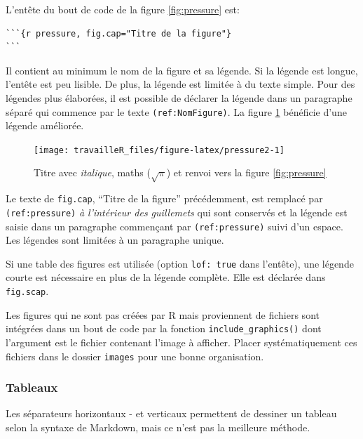 \documentclass[
  12pt,
  french,
  a4paper,
  extrafontsizes,onecolumn,openright
  ]{memoir}
\begin{document}
L'entête du bout de code de la figure \ref{fig:pressure} est:

\begin{verbatim}
```{r pressure, fig.cap="Titre de la figure"}
```
\end{verbatim}

Il contient au minimum le nom de la figure et sa légende.
Si la légende est longue, l'entête est peu lisible.
De plus, la légende est limitée à du texte simple.
Pour des légendes plus élaborées, il est possible de déclarer la légende dans un paragraphe séparé qui commence par le texte \texttt{(ref:NomFigure)}.
La figure \ref{fig:pressure2} bénéficie d'une légende améliorée.



\scriptsize

\begin{figure}

{\centering \texttt{[image: travailleR\_files/figure-latex/pressure2-1]} 

}

\caption{Titre avec \emph{italique}, maths (\(\sqrt\pi\)) et renvoi vers la figure \ref{fig:pressure}}\label{fig:pressure2}
\end{figure}

\normalsize

Le texte de \texttt{fig.cap}, \enquote{Titre de la figure} précédemment, est remplacé par \texttt{(ref:pressure)} \emph{à l'intérieur des guillemets} qui sont conservés et la légende est saisie dans un paragraphe commençant par \texttt{(ref:pressure)} suivi d'un espace.
Les légendes sont limitées à un paragraphe unique.

Si une table des figures est utilisée (option \texttt{lof:\ true} dans l'entête), une légende courte est nécessaire en plus de la légende complète.
Elle est déclarée dans \texttt{fig.scap}.

Les figures qui ne sont pas créées par R mais proviennent de fichiers sont intégrées dans un bout de code par la fonction \texttt{include\_graphics()} dont l'argument est le fichier contenant l'image à afficher.
Placer systématiquement ces fichiers dans le dossier \texttt{images} pour une bonne organisation.

\hypertarget{tableaux}{%
\subsubsection{Tableaux}\label{tableaux}}

Les séparateurs horizontaux - et verticaux \textbar{} permettent de dessiner un tableau selon la syntaxe de Markdown, mais ce n'est pas la meilleure méthode.
\end{document}
